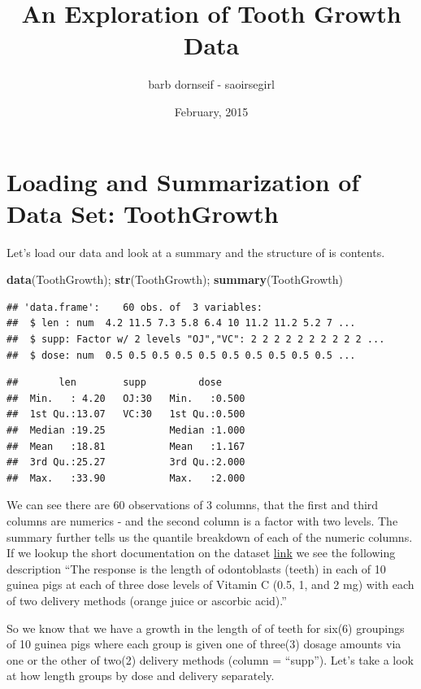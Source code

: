 \documentclass[]{article}
\title{An Exploration of Tooth Growth Data}
\author{barb dornseif - saoirsegirl}
\date{February, 2015}
\newenvironment{Shaded}{\begin{snugshade}}{\end{snugshade}}
\newcommand{\KeywordTok}[1]{\textcolor[rgb]{0.13,0.29,0.53}{\textbf{{#1}}}}
\newcommand{\NormalTok}[1]{{#1}}
\begin{document}
\maketitle


\section{Loading and Summarization of Data Set:
ToothGrowth}\label{loading-and-summarization-of-data-set-toothgrowth}

Let's load our data and look at a summary and the structure of is
contents.

\begin{Shaded}
\begin{Highlighting}[]
\KeywordTok{data}\NormalTok{(ToothGrowth); }\KeywordTok{str}\NormalTok{(ToothGrowth); }\KeywordTok{summary}\NormalTok{(ToothGrowth)}
\end{Highlighting}
\end{Shaded}

\begin{verbatim}
## 'data.frame':    60 obs. of  3 variables:
##  $ len : num  4.2 11.5 7.3 5.8 6.4 10 11.2 11.2 5.2 7 ...
##  $ supp: Factor w/ 2 levels "OJ","VC": 2 2 2 2 2 2 2 2 2 2 ...
##  $ dose: num  0.5 0.5 0.5 0.5 0.5 0.5 0.5 0.5 0.5 0.5 ...
\end{verbatim}

\begin{verbatim}
##       len        supp         dose      
##  Min.   : 4.20   OJ:30   Min.   :0.500  
##  1st Qu.:13.07   VC:30   1st Qu.:0.500  
##  Median :19.25           Median :1.000  
##  Mean   :18.81           Mean   :1.167  
##  3rd Qu.:25.27           3rd Qu.:2.000  
##  Max.   :33.90           Max.   :2.000
\end{verbatim}

We can see there are 60 observations of 3 columns, that the first and
third columns are numerics - and the second column is a factor with two
levels. The summary further tells us the quantile breakdown of each of
the numeric columns. If we lookup the short documentation on the dataset
\href{https://stat.ethz.ch/R-manual/R-devel/library/datasets/html/ToothGrowth.html}{link}
we see the following description ``The response is the length of
odontoblasts (teeth) in each of 10 guinea pigs at each of three dose
levels of Vitamin C (0.5, 1, and 2 mg) with each of two delivery methods
(orange juice or ascorbic acid).''

So we know that we have a growth in the length of of teeth for six(6)
groupings of 10 guinea pigs where each group is given one of three(3)
dosage amounts via one or the other of two(2) delivery methods (column =
``supp''). Let's take a look at how length groups by dose and delivery
separately.
\end{document}

